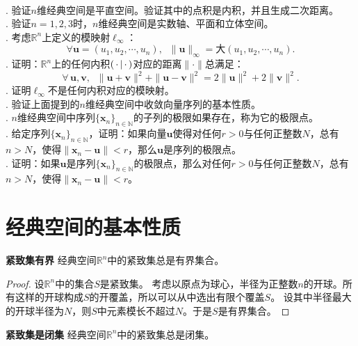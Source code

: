 \documentclass[12pt,UTF8]{ctexbook}
\begin{document}
\begin{appendix}
\begin{xt}
    \mbox{}\\
    . 验证$n$维经典空间是平直空间。验证其中的点积是内积，并且生成二次距离。\\
    . 验证$n=1,2,3$时，$n$维经典空间是实数轴、平面和立体空间。\\
    . 考虑$\mathbb{R}^n$上定义的模映射$\ell_{\infty}$：
    $$ \forall \mathbf{u} = (u_1, u_2, \cdots, u_n), \;\; \| \mathbf{u} \|_{\infty} = \text{大}(u_1, u_2, \cdots, u_n).$$
    . 证明：$\mathbb{R}^n$上的任何内积$\displaystyle\left( \,\cdot \,\middle\vert \,\cdot \,\right)$对应的距离$\|\cdot \|$总满足：
    $$\forall \, \mathbf{u}, \mathbf{v},\;\; \|\mathbf{u} + \mathbf{v}\|^2 + \|\mathbf{u} - \mathbf{v}\|^2 = 2\|\mathbf{u}\|^2 + 2\|\mathbf{v}\|^2. $$
    . 证明$\ell_{\infty}$不是任何内积对应的模映射。\\
    . 验证上面提到的$n$维经典空间中收敛向量序列的基本性质。\\
    . $n$维经典空间中序列$\{\mathbf{x}_n\}_{n\in\mathbb{N}}$的子列的极限如果存在，称为它的极限点。\\
    . 给定序列$\{\mathbf{x}_n\}_{n\in\mathbb{N}}$，证明：如果向量$\mathbf{u}$使得对任何$r>0$与任何正整数$N$，总有$n>N$，使得$\|\mathbf{x}_n - \mathbf{u}\| < r$，那么$\mathbf{u}$是序列的极限点。\\
    . 证明：如果$\mathbf{u}$是序列$\{\mathbf{x}_n\}_{n\in\mathbb{N}}$的极限点，那么对任何$r>0$与任何正整数$N$，总有$n>N$，使得$\|\mathbf{x}_n - \mathbf{u}\| < r$。\\

\end{xt}

\section{经典空间的基本性质}

\begin{tm}{\textbf{紧致集有界}}\label{tm:b-2-0}
    经典空间$\mathbb{R}^n$中的紧致集总是有界集合。
\end{tm}

\begin{proof}
    设$\mathbb{R}^n$中的集合$S$是紧致集。
    考虑以原点为球心，半径为正整数$n$的开球。所有这样的开球构成$S$的开覆盖，所以可以从中选出有限个覆盖$S$。
    设其中半径最大的开球半径为$N$，则$S$中元素模长不超过$N$。于是$S$是有界集合。
\end{proof}

\begin{tm}{\textbf{紧致集是闭集}}\label{tm:b-2-10}
    经典空间$\mathbb{R}^n$中的紧致集总是闭集。
\end{tm}


\end{appendix}
\end{document}
